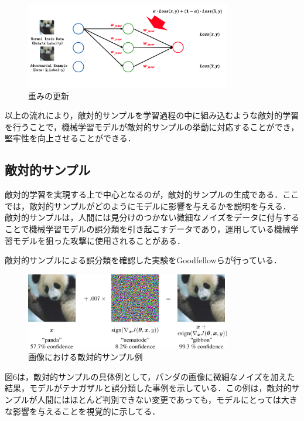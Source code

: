 \begin{algorithm_step}
    \begin{figure}[H]
        \centering
        \includegraphics[width=0.8\textwidth]{images/敵対的学習4.png}
        \caption{重みの更新}
        \label{fig:adversarial_learning4}
    \end{figure}

\end{algorithm_step}

以上の流れにより，敵対的サンプルを学習過程の中に組み込むような敵対的学習を行うことで，機械学習モデルが敵対的サンプルの挙動に対応することができ，堅牢性を向上させることができる．

\subsection{敵対的サンプル}
敵対的学習を実現する上で中心となるのが，敵対的サンプルの生成である．ここでは，敵対的サンプルがどのようにモデルに影響を与えるかを説明を与える．
敵対的サンプルは，人間には見分けのつかない微細なノイズをデータに付与することで機械学習モデルの誤分類を引き起こすデータであり，運用している機械学習モデルを狙った攻撃に使用されることがある\cite{MBSD-AdversarialExample}．

敵対的サンプルによる誤分類を確認した実験をGoodfellowらが行っている\cite{goodfellow2015explaining}．
\begin{figure}[H]
    \centering
    \includegraphics[width=0.8\textwidth]{images/goodfellow_panda.png}
    \caption{画像における敵対的サンプル例\cite{goodfellow2015explaining}}
    \label{fig:adversarial_example}
\end{figure}

図6は，敵対的サンプルの具体例として，パンダの画像に微細なノイズを加えた結果，モデルがテナガザルと誤分類した事例を示している．この例は，敵対的サンプルが人間にはほとんど判別できない変更であっても，モデルにとっては大きな影響を与えることを視覚的に示してる．

